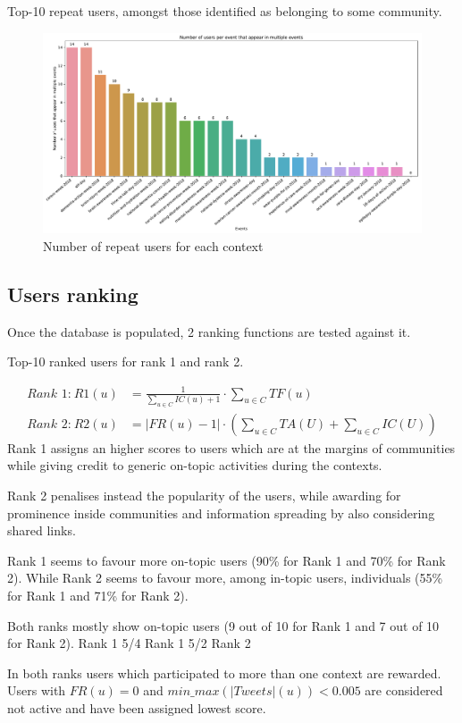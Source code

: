 \begin{table}
	\centering
	\resizebox{\textwidth}{!}{
		
	}
	\caption{Top-10 repeat users, amongst those identified as belonging to some community.}
	\label{tab:repeat-users}
\end{table}

\begin{figure}
	\centering
	\includegraphics[width=\textwidth]{figures/repeat-users-frequency}
	\caption{Number of repeat users for each context}
	\label{fig:repeat-users-frequency}
\end{figure}

\subsection{Users ranking} \label{sec:ranking}

Once the database is populated, 2 ranking functions are tested against it.
%
\begin{table}
	\centering
	\resizebox{\textwidth}{!}{
		
	}
	\caption{Top-10 ranked users for rank 1 and rank 2.}
	\label{tab:rank1}
\end{table}
%
\begin{align}
\textit{Rank 1:} ~ \mathit{R1}(u) & = \frac{1}{\sum_{u \in C} \mathit{IC}(u) + 1} \cdot \sum_{u \in C} \mathit{TF}(u) \label{eq:rank1} \\
\textit{Rank 2:} ~ \mathit{R2}(u) & = \lvert \mathit{FR}(u) - 1 \rvert \cdot \left(\sum_{u \in C} \mathit{TA}(U) + \sum_{u \in C} \mathit{IC}(U)\right) \label{eq:rank1}
\end{align}
%
Rank 1 assigns an higher scores to users which are at the margins of communities while giving credit to generic on-topic activities during the contexts.

Rank 2 penalises instead the popularity of the users, while awarding for prominence inside communities and information spreading by also considering shared links.

Rank 1 seems to favour more on-topic users (90\% for Rank 1 and 70\% for Rank 2). While Rank 2 seems to favour more, among in-topic users, individuals (55\% for Rank 1 and 71\% for Rank 2). 

Both ranks mostly show on-topic users (9 out of 10 for Rank 1 and 7 out of 10 for Rank 2). Rank 1 5/4 Rank 1 5/2 Rank 2

In both ranks users which participated to more than one context are rewarded. Users with $\mathit{FR}(u) = 0$ and $\mathit{min\_max(\lvert Tweets \rvert(u)) < 0.005}$ are considered not active and have been assigned lowest score.